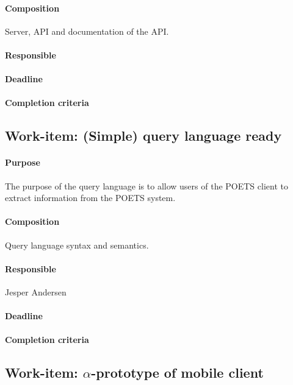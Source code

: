 \documentclass[envcountsame]{llncs}
\begin{document}
\paragraph{Composition} Server, API and documentation of the API.

\paragraph{Responsible}

\paragraph{Deadline}

\paragraph{Completion criteria}

\subsection*{Work-item: (Simple) query language ready}
\paragraph{Purpose} The purpose of the query language is to allow
users of the POETS client to extract information from the POETS
system.

\paragraph{Composition} Query language syntax and semantics.

\paragraph{Responsible} Jesper Andersen

\paragraph{Deadline}

\paragraph{Completion criteria}

\subsection*{Work-item: $\alpha$-prototype of mobile client}
\end{document}
